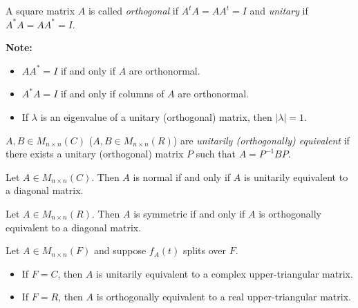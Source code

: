 \documentclass[12pt]{article}
\newenvironment{theorem}[2][Theorem]{\begin{trivlist}
\item[\hskip \labelsep {\bfseries #1}\hskip \labelsep {\bfseries #2.}]}{\end{trivlist}}
\newenvironment{definition}[2][Definition]{\begin{trivlist}
\item[\hskip \labelsep {\bfseries #1}\hskip \labelsep {\bfseries #2}]}{\end{trivlist}}
\begin{document}
\begin{definition}{10}
A square matrix $A$ is called \textit{orthogonal} if $A^tA = AA^t = I$ and \textit{unitary} if $A^*A = AA^* = I$.
\end{definition}

\noindent\textbf{Note:} \text{ }

\begin{itemize}
    \item $AA^* = I$ if and only if $A$ are orthonormal.
    
    \item $A^*A = I$ if and only if columns of $A$ are orthonormal. 
    
    \item If $\lambda$ is an eigenvalue of a unitary (orthogonal) matrix, then $\lvert \lambda \rvert = 1$.
\end{itemize}

\begin{definition}{11}
$A, B \in M_{n \times n}(C)$ ($A, B \in M_{n \times n}(R)$) are \textit{unitarily (orthogonally) equivalent} if there exists a unitary (orthogonal) matrix $P$ such that $A = P^{-1}BP$.
\end{definition}

\begin{theorem}{6.19}
Let $A \in M_{n \times n}(C)$. Then $A$ is normal if and only if $A$ is unitarily equivalent to a diagonal matrix. 
\end{theorem}

\begin{theorem}{6.20}
Let $A \in M_{n \times n}(R)$. Then $A$ is symmetric if and only if $A$ is orthogonally equivalent to a diagonal matrix.
\end{theorem}

\begin{theorem}{6.21 (Schur)}
Let $A \in M_{n \times n}(F)$ and suppose $f_A(t)$ splits over $F$.

\begin{itemize}
    \item[(a)] If $F = C$, then $A$ is unitarily equivalent to a complex upper-triangular matrix.
    
    \item[(b)] If $F = R$, then $A$ is orthogonally equivalent to a real upper-triangular matrix.
\end{itemize}
\end{theorem}
\end{document}
